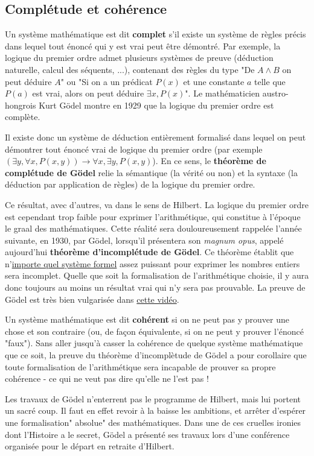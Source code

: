 \subsection{Complétude et cohérence}
Un système mathématique est dit \textbf{complet} s'il existe un système de règles précis dans lequel tout énoncé qui y est vrai peut être démontré. Par exemple, la logique du premier ordre admet plusieurs systèmes de preuve (déduction naturelle, calcul des séquents, ...), contenant des règles du type "De $A \wedge B$ on peut déduire $A$" ou "Si on a un prédicat $P(x)$ et une constante $a$ telle que $P(a)$ est vrai, alors on peut déduire $\exists x, P(x)$". Le mathématicien austro-hongrois Kurt Gödel montre en 1929 que la logique du premier ordre est complète. 

Il existe donc un système de déduction entièrement formalisé dans lequel on peut démontrer tout énoncé vrai de logique du premier ordre (par exemple $(\exists y, \forall x, P(x,y)) \rightarrow \forall x, \exists y, P(x,y)$). En ce sens, le \textbf{théorème de complétude de Gödel} relie la sémantique (la vérité ou non) et la syntaxe (la déduction par application de règles) de la logique du premier ordre.

Ce résultat, avec d'autres, va dans le sens de Hilbert. La logique du premier ordre est cependant trop faible pour exprimer l'arithmétique, qui constitue à l'époque le graal des mathématiques. Cette réalité sera douloureusement rappelée l'année suivante, en 1930, par Gödel, lorsqu'il présentera son \textit{magnum opus}, appelé aujourd'hui \textbf{théorème d'incomplétude de Gödel}. Ce théorème établit que n'\underline{importe quel système formel} assez puissant pour exprimer les nombres entiers sera incomplet. Quelle que soit la formalisation de l'arithmétique choisie, il y aura donc toujours au moins un résultat vrai qui n'y sera pas prouvable. La preuve de Gödel est très bien vulgarisée dans \href{https://www.youtube.com/watch?v=82jOF4Q6gBU}{cette vidéo}.

Un système mathématique est dit \textbf{cohérent} si on ne peut pas y prouver une chose et son contraire (ou, de façon équivalente, si on ne peut y prouver l'énoncé "faux"). Sans aller jusqu'à casser la cohérence de quelque système mathématique que ce soit, la preuve du théorème d'incomplètude de Gödel a pour corollaire que toute formalisation de l'arithmétique sera incapable de prouver sa propre cohérence - ce qui ne veut pas dire qu'elle ne l'est pas !

Les travaux de Gödel n'enterrent pas le programme de Hilbert, mais lui portent un sacré coup. Il faut en effet revoir à la baisse les ambitions, et arrêter d'espérer une formalisation" absolue" des mathématiques. Dans une de ces cruelles ironies dont l'Histoire a le secret, Gödel a présenté ses travaux lors d'une conférence organisée pour le départ en retraite d'Hilbert.

